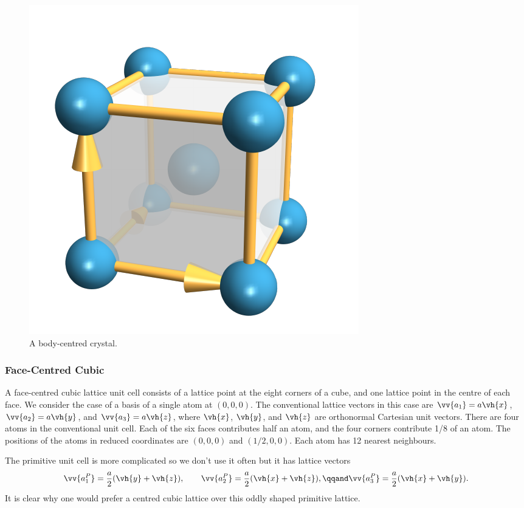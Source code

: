 \documentclass[fleqn]{NotesClass}
\begin{document}
    \begin{figure}
        \includegraphics{images/bcc-crystal.pdf}
        \caption[BCC crystal]{A body-centred crystal.}
    \end{figure}
    
    \subsubsection{Face-Centred Cubic}
    A face-centred cubic lattice unit cell consists of a lattice point at the eight corners of a cube, and one lattice point in the centre of each face.
    We consider the case of a basis of a single atom at \((0, 0, 0)\).
    The conventional lattice vectors in this case are \(\vv{a_1} = a\vh{x}\), \(\vv{a_2} = a\vh{y}\), and \(\vv{a_3} = a\vh{z}\), where \(\vh{x}\), \(\vh{y}\), and \(\vh{z}\) are orthonormal Cartesian unit vectors.
    There are four atoms in the conventional unit cell.
    Each of the six faces contributes half an atom, and the four corners contribute 1/8 of an atom.
    The positions of the atoms in reduced coordinates are \((0, 0, 0)\) and \((1/2, 0, 0)\).
    Each atom has 12 nearest neighbours.
    
    The primitive unit cell is more complicated so we don't use it often but it has lattice vectors
    \begin{equation}
        \vv{a_1^P} = \frac{a}{2}(\vh{y} + \vh{z}), \qquad \vv{a_2^P} = \frac{a}{2}(\vh{x} + \vh{z}), \qqand \vv{a_3^P} = \frac{a}{2}(\vh{x} + \vh{y}).
    \end{equation}
    It is clear why one would prefer a centred cubic lattice over this oddly shaped primitive lattice.
    
\end{document}
